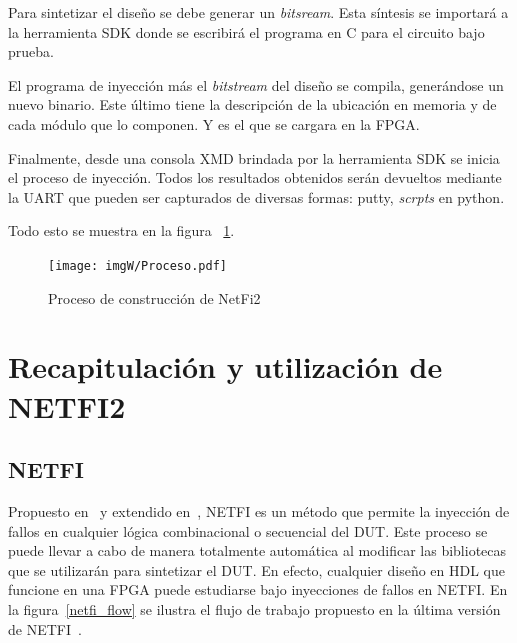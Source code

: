 \documentclass[a4paper,openright,12pt]{report}
\begin{document}
Para sintetizar el diseño se debe  generar un \textit{bitsream}. Esta síntesis se importará a la herramienta SDK donde se escribirá el programa en C  para el circuito bajo prueba. 

El programa de inyección  más el \textit{bitstream} del diseño se compila, generándose un  nuevo binario. Este último tiene la descripción de la ubicación en  memoria y de cada módulo que lo componen. Y es el que se cargara en la FPGA.

Finalmente, desde una consola XMD brindada por la herramienta SDK se inicia el proceso de inyección. Todos los resultados obtenidos serán devueltos mediante la UART que pueden ser capturados de diversas formas: putty, \textit{scrpts} en python.

Todo esto se muestra en la figura ~\ref{proceso}.
\begin{figure}[H]
	\centering
	\texttt{[image: imgW/Proceso.pdf]}
	\caption{Proceso de construcción de NetFi2 }
	\label{proceso}
    \end{figure}
    
    
    
    

    

\chapter{Recapitulación y utilización de NETFI2}


\section{NETFI}

Propuesto en~\cite{Mansour2013-1} y extendido en~\cite{Mansour2013-2}, NETFI es un método que permite la inyección de fallos en cualquier lógica combinacional o secuencial del DUT. Este proceso se puede llevar a cabo de manera totalmente automática al modificar las bibliotecas que se utilizarán para sintetizar el DUT. En efecto, cualquier diseño en HDL que funcione en una FPGA puede estudiarse bajo inyecciones de fallos en NETFI. En la figura~\ref{netfi_flow} se ilustra el flujo de trabajo propuesto en la última versión de NETFI~\cite{Mansour2013-2}.
\end{document}
